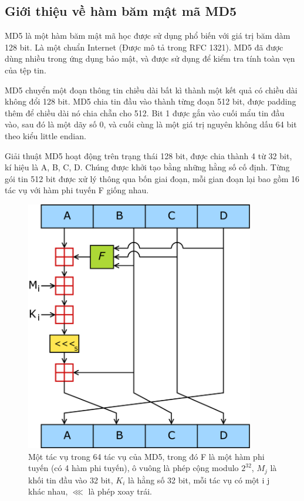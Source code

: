 \documentclass[../report.tex]{subfiles}
\begin{document}
\subsection{Giới thiệu về hàm băm mật mã MD5}
MD5 là một hàm băm mật mã học được sử dụng phổ biến với giá trị băm dàm 128 bit. Là một chuẩn Internet (Được mô tả trong RFC 1321). 
MD5 đã được dùng nhiều trong ứng dụng bảo mật, và được sử dụng để kiểm tra tính toàn vẹn của tệp tin. 

MD5 chuyển một đoạn thông tin chiều dài bất kì thành một kết quả có chiều dài không đổi 128 bit. 
MD5 chia tin đầu vào thành từng đoạn 512 bit, được padding thêm để chiều dài nó chia chẵn cho 512. 
Bit 1 được gắn vào cuối mẩu tin đầu vào, sau đó là một dãy số 0, và cuối cùng là một giá trị nguyên không dấu 
64 bit theo kiểu little endian. 

Giải thuật MD5 hoạt động trên trạng thái 128 bit, được chia thành 4 từ 32 bit, kí hiệu là A, B, C, D. Chúng được 
khởi tạo bằng những hằng số cố định. 
Từng gói tin 512 bit được xử lý thông qua bốn giai đoạn, 
mỗi gian đoạn lại bao gồm 16 tác vụ với hàm phi tuyến F giống nhau. 

\begin{figure}[H]
\centering
\includegraphics[width=10cm]{figures/md5-diagram.png}
\caption{Một tác vụ trong 64 tác vụ của MD5, trong đó F là một hàm phi tuyến (có 4 hàm phi tuyến), 
ô vuông là phép cộng modulo $2^{32}$, $M_j$ là khối tin đầu vào 32 bit, $K_i$ là hằng số 32 bit, 
mỗi tác vụ có một i j khác nhau, $\lll$ là phép xoay trái.}
\end{figure}
\end{document}
